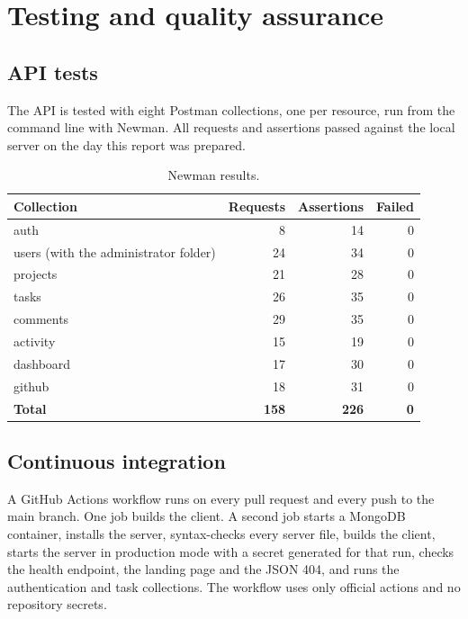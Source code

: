 \documentclass[11pt,a4paper]{article}
\begin{document}
\section{Testing and quality assurance}

\subsection{API tests}
The API is tested with eight Postman collections, one per resource, run from the command line with Newman. All requests and assertions passed against the local server on the day this report was prepared.

\begin{table}[H]
\centering\small
\begin{tabular}{@{}lrrr@{}}
\toprule
\textbf{Collection} & \textbf{Requests} & \textbf{Assertions} & \textbf{Failed}\\
\midrule
auth & 8 & 14 & 0\\
users (with the administrator folder) & 24 & 34 & 0\\
projects & 21 & 28 & 0\\
tasks & 26 & 35 & 0\\
comments & 29 & 35 & 0\\
activity & 15 & 19 & 0\\
dashboard & 17 & 30 & 0\\
github & 18 & 31 & 0\\
\midrule
\textbf{Total} & \textbf{158} & \textbf{226} & \textbf{0}\\
\bottomrule
\end{tabular}
\caption{Newman results.}
\end{table}

\subsection{Continuous integration}
A GitHub Actions workflow runs on every pull request and every push to the main branch. One job builds the client. A second job starts a MongoDB container, installs the server, syntax-checks every server file, builds the client, starts the server in production mode with a secret generated for that run, checks the health endpoint, the landing page and the JSON 404, and runs the authentication and task collections. The workflow uses only official actions and no repository secrets.
\end{document}
